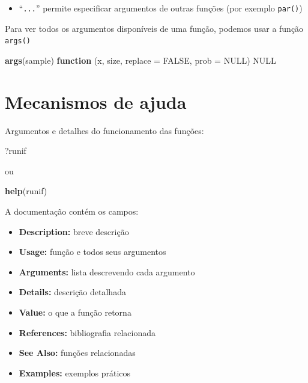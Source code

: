 \documentclass[10pt,a4paper]{book}
\newenvironment{Shaded}{\begin{snugshade}}{\end{snugshade}}
\newcommand{\KeywordTok}[1]{\textcolor[rgb]{0.13,0.29,0.53}{\textbf{#1}}}
\newcommand{\DataTypeTok}[1]{\textcolor[rgb]{0.13,0.29,0.53}{#1}}
\newcommand{\OtherTok}[1]{\textcolor[rgb]{0.56,0.35,0.01}{#1}}
\newcommand{\ControlFlowTok}[1]{\textcolor[rgb]{0.13,0.29,0.53}{\textbf{#1}}}
\newcommand{\NormalTok}[1]{#1}
\providecommand{\tightlist}{%
  \setlength{\itemsep}{0pt}\setlength{\parskip}{0pt}}
\begin{document}
\begin{itemize}
\tightlist
\item
  ``\texttt{...}'' permite especificar argumentos de outras funções (por
  exemplo \texttt{par()})
\end{itemize}

Para ver todos os argumentos disponíveis de uma função, podemos usar a
função \texttt{args()}

\begin{Shaded}
\begin{Highlighting}[]
\KeywordTok{args}\NormalTok{(sample)}
\ControlFlowTok{function}\NormalTok{ (x, size, }\DataTypeTok{replace =} \OtherTok{FALSE}\NormalTok{, }\DataTypeTok{prob =} \OtherTok{NULL}\NormalTok{) }
\OtherTok{NULL}
\end{Highlighting}
\end{Shaded}

\section{Mecanismos de ajuda}\label{mecanismos-de-ajuda}

Argumentos e detalhes do funcionamento das funções:

\begin{Shaded}
\begin{Highlighting}[]
\NormalTok{?runif}
\end{Highlighting}
\end{Shaded}

ou

\begin{Shaded}
\begin{Highlighting}[]
\KeywordTok{help}\NormalTok{(runif)}
\end{Highlighting}
\end{Shaded}

A documentação contém os campos:

\begin{itemize}
\tightlist
\item
  \textbf{Description:} breve descrição
\item
  \textbf{Usage:} função e todos seus argumentos
\item
  \textbf{Arguments:} lista descrevendo cada argumento
\item
  \textbf{Details:} descrição detalhada
\item
  \textbf{Value:} o que a função retorna
\item
  \textbf{References:} bibliografia relacionada
\item
  \textbf{See Also:} funções relacionadas
\item
  \textbf{Examples:} exemplos práticos
\end{itemize}
\end{document}
